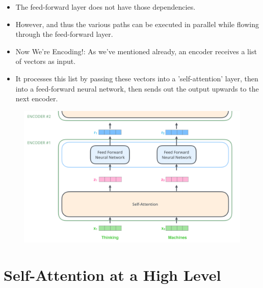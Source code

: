\begin{itemize}
\item The feed-forward layer does not have those dependencies.

\item However, and thus the various paths can be executed in parallel while flowing through the feed-forward layer.


\item Now We’re Encoding!: As we've mentioned already, an encoder receives a list of vectors as input. 

\item It processes this list by passing these vectors into a 'self-attention' layer, then into a feed-forward neural network, then sends out the output upwards to the next encoder.

\end{itemize}

\begin{figure}[h]
        	\includegraphics[scale = 0.2]{pics/encoder_with_tensors_2.png}
        \end{figure}  



\section{Self-Attention at a High Level}

